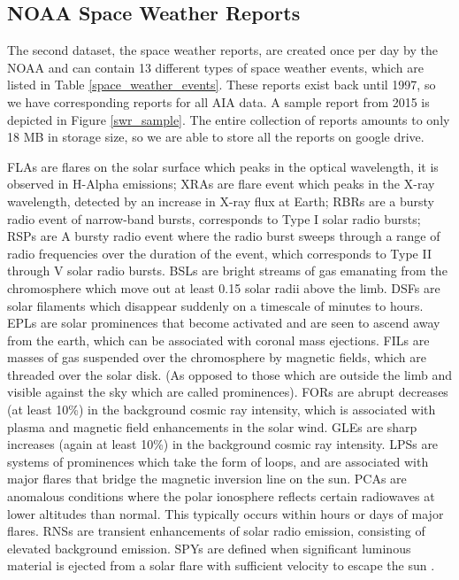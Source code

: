 \documentclass[12pt, letterpaper]{article}
\begin{document}
\subsection*{NOAA Space Weather Reports}

The second dataset, the space weather reports, are created once per day by the NOAA and can contain 13 different types of space weather events, which are listed in Table \ref{space_weather_events}. These reports exist back until 1997, so we have corresponding reports for all AIA data. A sample report from 2015 is depicted in Figure \ref{swr_sample}. The entire collection of reports amounts to only 18 MB in storage size, so we are able to store all the reports on google drive.

FLAs are flares on the solar surface which peaks in the optical wavelength, it is observed in H-Alpha emissions; XRAs are flare event which peaks in the X-ray wavelength, detected by an increase in X-ray flux at Earth; RBRs are a bursty radio event of narrow-band bursts, corresponds to Type I solar radio bursts; RSPs are A bursty radio event where the radio burst sweeps through a range of radio frequencies over the duration of the event, which corresponds to Type II through V solar radio bursts. BSLs are bright streams of gas emanating from the chromosphere which move out at least 0.15 solar radii above the limb. DSFs are solar filaments which disappear suddenly on a timescale of minutes to hours. EPLs are solar prominences that become activated and are seen to ascend away from the earth, which can be associated with coronal mass ejections. FILs are masses of gas suspended over the chromosphere by magnetic fields, which are threaded over the solar disk. (As opposed to those which are outside the limb and visible against the sky which are called prominences). FORs are abrupt decreases (at least 10\%) in the background cosmic ray intensity, which is associated with plasma and magnetic field enhancements in the solar wind. GLEs are sharp increases (again at least 10\%) in the background cosmic ray intensity. LPSs are systems of prominences which take the form of loops, and are associated with major flares that bridge the magnetic inversion line on the sun. PCAs are anomalous conditions where the polar ionosphere reflects certain radiowaves at lower altitudes than normal. This typically occurs within hours or days of major flares. RNSs are transient enhancements of solar radio emission, consisting of elevated background emission. SPYs are defined when significant luminous material is ejected from a solar flare with sufficient velocity to escape the sun \cite{SWPC_Glossary}.
\end{document}
